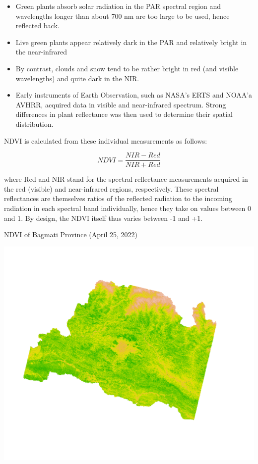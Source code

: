 \documentclass[11pt,dvipsnames,ignorenonframetext,aspectratio=169]{beamer}
\providecommand{\tightlist}{%
  \setlength{\itemsep}{0pt}\setlength{\parskip}{0pt}}
\begin{document}
\begin{frame}{}
\protect\hypertarget{section-7}{}
\begin{itemize}
\tightlist
\item
  Green plants absorb solar radiation in the PAR spectral region and
  wavelengths longer than about 700 nm are too large to be used, hence
  reflected back.
\item
  Live green plants appear relatively dark in the PAR and relatively
  bright in the near-infrared
\item
  By contrast, clouds and snow tend to be rather bright in red (and
  visible wavelengths) and quite dark in the NIR.
\item
  Early instruments of Earth Observation, such as NASA's ERTS and NOAA'a
  AVHRR, acquired data in visible and near-infrared spectrum. Strong
  differences in plant reflectance was then used to determine their
  spatial distribution.
\end{itemize}
\end{frame}

\begin{frame}{}
\protect\hypertarget{section-8}{}
NDVI is calculated from these individual measurements as follows:

\[
NDVI = \frac{NIR - Red}{NIR + Red}
\]

where Red and NIR stand for the spectral reflectance measurements
acquired in the red (visible) and near-infrared regions, respectively.
These spectral reflectances are themselves ratios of the reflected
radiation to the incoming radiation in each spectral band individually,
hence they take on values between 0 and 1. By design, the NDVI itself
thus varies between -1 and +1.
\end{frame}

\begin{frame}{NDVI of Bagmati Province (April 25, 2022)}
\protect\hypertarget{ndvi-of-bagmati-province-april-25-2022}{}
\begin{center}\includegraphics[width=0.7\linewidth]{../images/r_lc09_bagmati_raster_ndvi_value} \end{center}
\end{frame}
\end{document}
